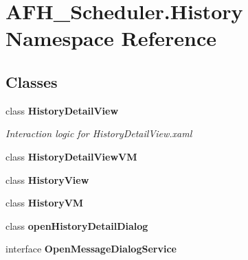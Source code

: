 \section{A\+F\+H\+\_\+\+Scheduler.\+History Namespace Reference}
\label{namespace_a_f_h___scheduler_1_1_history}
\subsection*{Classes}
\begin{DoxyCompactItemize}
\item 
class \textbf{ History\+Detail\+View}
\begin{DoxyCompactList}\small\item\em Interaction logic for History\+Detail\+View.\+xaml \end{DoxyCompactList}\item 
class \textbf{ History\+Detail\+View\+VM}
\item 
class \textbf{ History\+View}
\item 
class \textbf{ History\+VM}
\item 
class \textbf{ open\+History\+Detail\+Dialog}
\item 
interface \textbf{ Open\+Message\+Dialog\+Service}
\end{DoxyCompactItemize}

